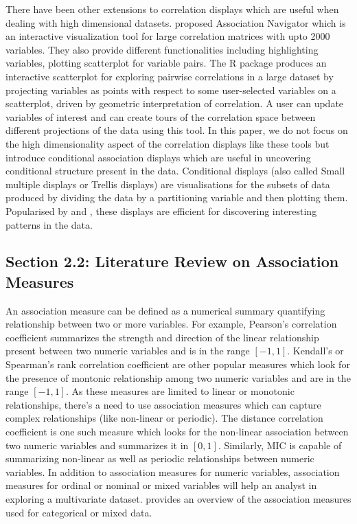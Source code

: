 There have been other extensions to correlation displays which are
useful when dealing with high dimensional datasets.
\citet{buja2016visualization} proposed Association Navigator which is an
interactive visualization tool for large correlation matrices with upto
2000 variables. They also provide different functionalities including
highlighting variables, plotting scatterplot for variable pairs. The R
package  \citep{sCorrPlot} produces an
interactive scatterplot for exploring pairwise correlations in a large
dataset by projecting variables as points with respect to some
user-selected variables on a scatterplot, driven by geometric
interpretation of correlation. A user can update variables of interest
and can create tours of the correlation space between different
projections of the data using this tool. In this paper, we do not focus
on the high dimensionality aspect of the correlation displays like these
tools but introduce conditional association displays which are useful in
uncovering conditional structure present in the data. Conditional
displays (also called Small multiple displays or Trellis displays) are
visualisations for the subsets of data produced by dividing the data by
a partitioning variable and then plotting them. Popularised by
\citet{tufte1986thevisual} and \citet{becker1996thevisual}, these
displays are efficient for discovering interesting patterns in the data.

\hypertarget{section-2.2-literature-review-on-association-measures}{%
\subsection{Section 2.2: Literature Review on Association
Measures}\label{section-2.2-literature-review-on-association-measures}}

An association measure can be defined as a numerical summary quantifying
relationship between two or more variables. For example, Pearson's
correlation coefficient summarizes the strength and direction of the
linear relationship present between two numeric variables and is in the
range \([-1,1]\). Kendall's or Spearman's rank correlation coefficient
are other popular measures which look for the presence of montonic
relationship among two numeric variables and are in the range
\([-1,1]\). As these measures are limited to linear or monotonic
relationships, there's a need to use association measures which can
capture complex relationships (like non-linear or periodic). The
distance correlation coefficient \citep{szekely2007measuring} is one
such measure which looks for the non-linear association between two
numeric variables and summarizes it in \([0,1]\). Similarly, MIC
\citep{reshef2011detecting} is capable of summarizing non-linear as well
as periodic relationships between numeric variables. In addition to
association measures for numeric variables, association measures for
ordinal or nominal or mixed variables will help an analyst in exploring
a multivariate dataset. \citet{taha201673} provides an overview of the
association measures used for categorical or mixed data.

